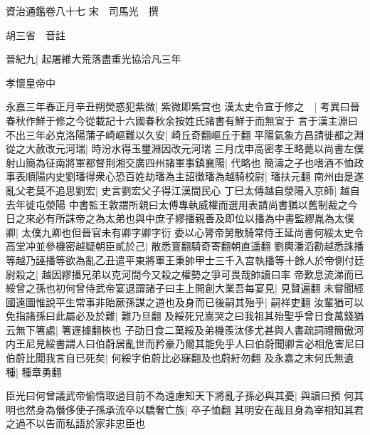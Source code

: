 資治通鑑卷八十七
宋　司馬光　撰

胡三省　音註

晉紀九|{
	起屠維大荒落盡重光協洽凡三年}


孝懷皇帝中

永嘉三年春正月辛丑朔熒惑犯紫微|{
	紫微即紫宫也}
漢太史令宣于修之　|{
	考異曰晉春秋作鮮于修之今從載記十六國春秋余按姓氏諸書有鮮于而無宣于}
言于漢主淵曰不出三年必克洛陽蒲子崎嶇難以久安|{
	崎丘奇翻嶇丘于翻}
平陽氣象方昌請徙都之淵從之大赦改元河瑞|{
	時汾水得玉璽淵因改元河瑞}
三月戊申高密孝王略薨以尚書左僕射山簡為征南將軍都督荆湘交廣四州諸軍事鎮襄陽|{
	代略也}
簡濤之子也嗜酒不恤政事表順陽内史劉璠得衆心恐百姓劫璠為主詔徵璠為越騎校尉|{
	璠扶元翻}
南州由是遂亂父老莫不追思劉宏|{
	史言劉宏父子得江漢間民心}
丁巳太傅越自滎陽入京師|{
	越自去年徙屯滎陽}
中書監王敦謂所親曰太傅專執威權而選用表請尚書猶以舊制裁之今日之來必有所誅帝之為太弟也與中庶子繆播親善及即位以播為中書監繆胤為太僕卿|{
	太僕九卿也但晉官未有卿字卿字衍}
委以心膂帝舅散騎常侍王延尚書何綏太史令高堂冲並參機密越疑朝臣貳於己|{
	散悉亶翻騎奇寄翻朝直遥翻}
劉輿潘滔勸越悉誅播等越乃誣播等欲為亂乙丑遣平東將軍王秉帥甲士三千入宫執播等十餘人於帝側付廷尉殺之|{
	越因繆播兄弟以克河間今又殺之權勢之爭可畏哉帥讀曰率}
帝歎息流涕而已綏曾之孫也初何曾侍武帝宴退謂諸子曰主上開創大業吾每宴見|{
	見賢遍翻}
未嘗聞經國遠圖惟說平生常事非貽厥孫謀之道也及身而已後嗣其殆乎|{
	嗣祥吏翻}
汝輩猶可以免指諸孫曰此屬必及於難|{
	難乃旦翻}
及綏死兄嵩哭之曰我祖其殆聖乎曾日食萬錢猶云無下箸處|{
	箸遟據翻梜也}
子劭日食二萬綏及弟機羨汰侈尤甚與人書疏詞禮簡傲河内王尼見綏書謂人曰伯蔚居亂世而矜豪乃爾其能免乎人曰伯蔚聞卿言必相危害尼曰伯蔚比聞我言自已死矣|{
	何綏字伯蔚比必寐翻及也蔚紆勿翻}
及永嘉之末何氏無遺種|{
	種章勇翻}


臣光曰何曾議武帝偷惰取過目前不為遠慮知天下將亂子孫必與其憂|{
	與讀曰預}
何其明也然身為僭侈使子孫承流卒以驕奢亡族|{
	卒子恤翻}
其明安在哉且身為宰相知其君之過不以告而私語於家非忠臣也

